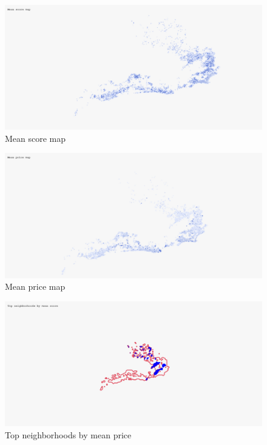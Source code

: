 \vspace{1em}
\begin{figure}[H]
    \centering
    \includegraphics[width=1\textwidth]{images/q6_1.jpg}
    \caption{Mean score map}\label{fig:figureq11}
\end{figure}

\vspace{1em}
\begin{figure}[H]
    \centering
    \includegraphics[width=1\textwidth]{images/q6_2.jpg}
    \caption{Mean price map}\label{fig:figureq12}
\end{figure}

\vspace{1em}
\begin{figure}[H]
    \centering
    \includegraphics[width=1\textwidth]{images/q6_3.jpg}
    \caption{Top neighborhoods by mean price}\label{fig:figureq13}
\end{figure}

